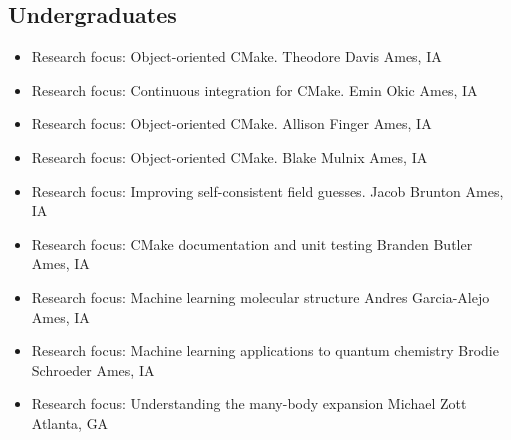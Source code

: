 \documentclass[11pt,a4paper,sans]{moderncv}
\begin{document}
\subsection{Undergraduates}
\begin{itemize}
	\item{
		{Research focus: Object-oriented CMake.}
		{Theodore Davis}
		{Ames, IA}
		{}{}
	}
	\item{
		{Research focus: Continuous integration for CMake.}
		{Emin Okic}
		{Ames, IA}
		{}{}
	}
	\item{
		{Research focus: Object-oriented CMake.}
		{Allison Finger}
		{Ames, IA}
		{}{}
	}
	\item{
		{Research focus: Object-oriented CMake.}
		{Blake Mulnix}
		{Ames, IA}
		{}{}
	}
	\item{
		{Research focus: Improving self-consistent field guesses.}
		{Jacob Brunton}
		{Ames, IA}
		{}{}
	}
	\item{
		{Research focus: CMake documentation and unit testing}
		{Branden Butler}
		{Ames, IA}
		{}{}
	}
	\item{
		{Research focus: Machine learning molecular structure}
		{Andres Garcia-Alejo}
		{Ames, IA}
		{}{}
	}
	\item{
		{Research focus: Machine learning applications to quantum chemistry}
		{Brodie Schroeder}
		{Ames, IA}
		{}{}
	}
	\item{
		{Research focus: Understanding the many-body expansion}
		{Michael Zott}
		{Atlanta, GA}
		{}{}
	}
\end{itemize}
\end{document}
